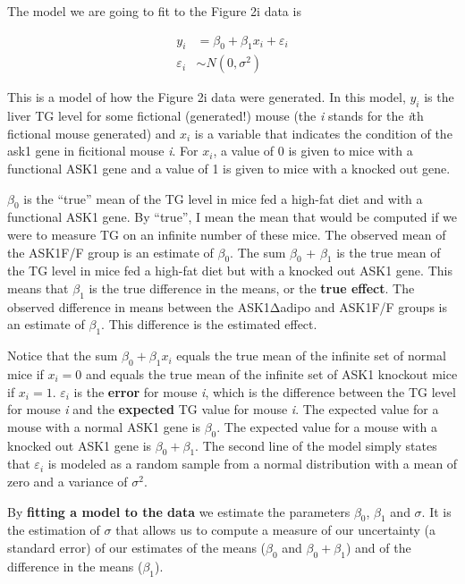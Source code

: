 \documentclass[]{book}
\begin{document}
The model we are going to fit to the Figure 2i data is

\begin{align}
y_i &= \beta_0 + \beta_1 x_i + \varepsilon_i\\
\varepsilon_i &\sim N(0, \sigma^2)
\end{align}

This is a model of how the Figure 2i data were generated. In this model, \(y_i\) is the liver TG level for some fictional (generated!) mouse (the \emph{i} stands for the \emph{i}th fictional mouse generated) and \(x_i\) is a variable that indicates the condition of the ask1 gene in ficitional mouse \emph{i}. For \(x_i\), a value of 0 is given to mice with a functional ASK1 gene and a value of 1 is given to mice with a knocked out gene.

\(\beta_0\) is the ``true'' mean of the TG level in mice fed a high-fat diet and with a functional ASK1 gene. By ``true'', I mean the mean that would be computed if we were to measure TG on an infinite number of these mice. The observed mean of the ASK1F/F group is an estimate of \(\beta_0\). The sum \(\beta_0\) + \(\beta_1\) is the true mean of the TG level in mice fed a high-fat diet but with a knocked out ASK1 gene. This means that \(\beta_1\) is the true difference in the means, or the \textbf{true effect}. The observed difference in means between the ASK1Δadipo and ASK1F/F groups is an estimate of \(\beta_1\). This difference is the estimated effect.

Notice that the sum \(\beta_0 + \beta_1 x_i\) equals the true mean of the infinite set of normal mice if \(x_i = 0\) and equals the true mean of the infinite set of ASK1 knockout mice if \(x_i = 1\). \(\varepsilon_i\) is the \textbf{error} for mouse \emph{i}, which is the difference between the TG level for mouse \emph{i} and the \textbf{expected} TG value for mouse \emph{i}. The expected value for a mouse with a normal ASK1 gene is \(\beta_0\). The expected value for a mouse with a knocked out ASK1 gene is \(\beta_0 + \beta_1\). The second line of the model simply states that \(\varepsilon_i\) is modeled as a random sample from a normal distribution with a mean of zero and a variance of \(\sigma^2\).

By \textbf{fitting a model to the data} we estimate the parameters \(\beta_0\), \(\beta_1\) and \(\sigma\). It is the estimation of \(\sigma\) that allows us to compute a measure of our uncertainty (a standard error) of our estimates of the means (\(\beta_0\) and \(\beta_0 + \beta_1\)) and of the difference in the means (\(\beta_1\)).
\end{document}
